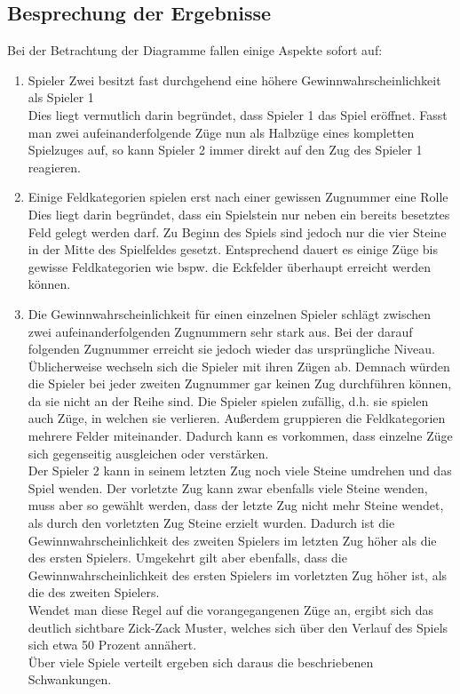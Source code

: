 \subsection{Besprechung der Ergebnisse}
Bei der Betrachtung der Diagramme fallen einige Aspekte sofort auf:
\begin{enumerate}
\item Spieler Zwei besitzt fast durchgehend eine höhere Gewinnwahrscheinlichkeit als Spieler 1
\\Dies liegt vermutlich darin begründet, dass Spieler 1 das Spiel eröffnet. Fasst man zwei aufeinanderfolgende Züge nun als Halbzüge eines kompletten Spielzuges auf, so kann Spieler 2 immer direkt auf den Zug des Spieler 1 reagieren.
\item Einige Feldkategorien spielen erst nach einer gewissen Zugnummer eine Rolle
\\Dies liegt darin begründet, dass ein Spielstein nur neben ein bereits besetztes Feld gelegt werden darf. Zu Beginn des Spiels sind jedoch nur die vier Steine in der Mitte des Spielfeldes gesetzt. Entsprechend dauert es einige Züge bis gewisse Feldkategorien wie bspw. die Eckfelder überhaupt erreicht werden können.
\item Die Gewinnwahrscheinlichkeit für einen einzelnen Spieler schlägt zwischen zwei aufeinanderfolgenden Zugnummern sehr stark aus. Bei der darauf folgenden Zugnummer erreicht sie jedoch wieder das ursprüngliche Niveau.
\\Üblicherweise wechseln sich die Spieler mit ihren Zügen ab. Demnach würden die Spieler bei jeder zweiten Zugnummer gar keinen Zug durchführen können, da sie nicht an der Reihe sind. Die Spieler spielen zufällig, d.h. sie spielen auch Züge, in welchen sie verlieren. Außerdem gruppieren die Feldkategorien mehrere Felder miteinander. Dadurch kann es vorkommen, dass einzelne Züge sich gegenseitig ausgleichen oder verstärken.
\\Der Spieler 2 kann in seinem letzten Zug noch viele Steine umdrehen und das Spiel wenden. Der vorletzte Zug kann zwar ebenfalls viele Steine wenden, muss aber so gewählt werden, dass der letzte Zug nicht mehr Steine wendet, als durch den vorletzten Zug  Steine erzielt wurden. Dadurch ist die Gewinnwahrscheinlichkeit des zweiten Spielers im letzten Zug höher als die des ersten Spielers. Umgekehrt gilt aber ebenfalls, dass die Gewinnwahrscheinlichkeit des ersten Spielers im vorletzten Zug höher ist, als die des zweiten Spielers.
\\Wendet man diese Regel auf die vorangegangenen Züge an, ergibt sich das deutlich sichtbare Zick-Zack Muster, welches sich über den Verlauf des Spiels sich etwa 50 Prozent annähert.
\\Über viele Spiele verteilt ergeben sich daraus die beschriebenen Schwankungen.
\end{enumerate}
